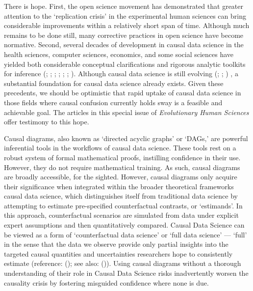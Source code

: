 \documentclass[
  singlecolumn,
  9pt]{article}
\begin{document}
There is hope. First, the open science movement has demonstrated that
greater attention to the `replication crisis' in the experimental human
sciences can bring considerable improvements within a relatively short
span of time. Although much remains to be done still, many corrective
practices in open science have become normative. Second, several decades
of development in causal data science in the health sciences, computer
sciences, economics, and some social sciences have yielded both
considerable conceptual clarifications and rigorous analytic toolkits
for inference (;
; ; ;
; ; ). Although
causal data science is still evolving (; ; ) , a
substantial foundation for causal data science already exists. Given
these precedents, we should be optimistic that rapid uptake of causal
data science in those fields where causal confusion currently holds sway
is a feasible and achievable goal. The articles in this special issue of
\emph{Evolutionary Human Sciences} offer testimony to this hope.

Causal diagrams, also known as `directed acyclic graphs' or `DAGs,' are
powerful inferential tools in the workflows of causal data science.
These tools rest on a robust system of formal mathematical proofs,
instilling confidence in their use. However, they do not require
mathematical training. As such, causal diagrams are broadly accessible,
for the sighted. However, causal diagrams only acquire their
significance when integrated within the broader theoretical frameworks
causal data science, which distinguishes itself from traditional data
science by attempting to estimate pre-specified counterfactual
contrasts, or `estimands'. In this approach, counterfactual scenarios
are simulated from data under explicit expert assumptions and then
quantitatively compared. Causal Data Science can be viewed as a form of
`counterfactual data science' or `full data science' --- `full' in the
sense that the data we observe provide only partial insights into the
targeted causal quantities and uncertainties researchers hope to
consistently estimate (reference: (); see also: ()). Using causal diagrams without a thorough understanding of their
role in Causal Data Science risks inadvertently worsen the causality
crisis by fostering misguided confidence where none is due.
\end{document}
